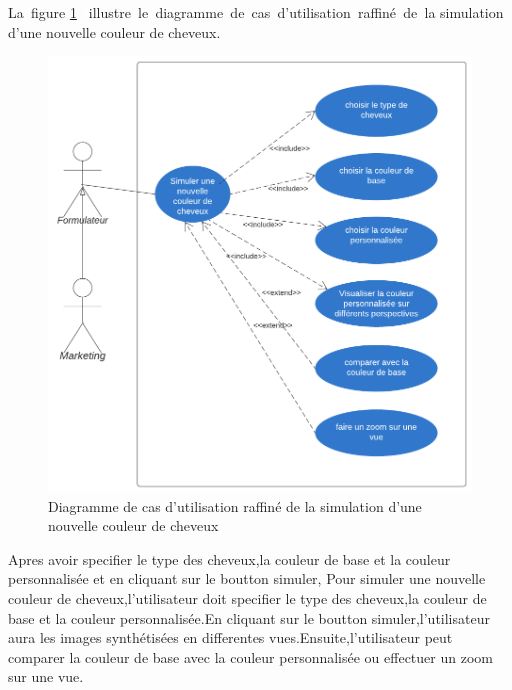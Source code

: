 \newpage
La\textcolor{white}{J}figure \ref{fig:diagCaseRaf5} \textcolor{white}{J}illustre\textcolor{white}{J}le\textcolor{white}{J}diagramme\textcolor{white}{J}de\textcolor{white}{J}cas\textcolor{white}{J}d’utilisation\textcolor{white}{J}raffiné\textcolor{white}{J}de\textcolor{white}{J}la simulation d'une nouvelle couleur de cheveux.
\begin{figure}[!ht]\centering
\includegraphics[angle=00]{chapitres/chapitre5/figures/Diagramme de cas d'utilisation (simulation).png}
\caption{ Diagramme de cas d’utilisation raffiné de la simulation d'une nouvelle couleur de cheveux }
\label{fig:diagCaseRaf5}
\end{figure}

Apres avoir specifier le type des cheveux,la couleur de base et la couleur personnalisée et en cliquant sur le boutton simuler,
Pour simuler une nouvelle couleur de cheveux,l'utilisateur doit specifier le type des cheveux,la couleur de base et la couleur personnalisée.En cliquant sur le boutton simuler,l'utilisateur aura les images synthétisées en differentes vues.Ensuite,l'utilisateur peut comparer la couleur de base avec la couleur personnalisée ou effectuer un zoom sur une vue.


\newpage
\newpage
